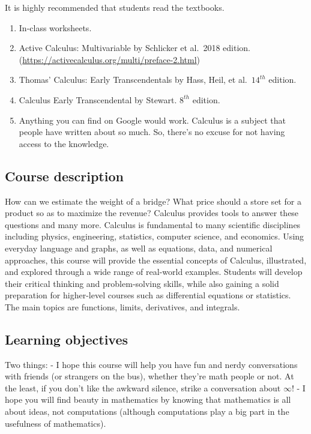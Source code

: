\documentclass[
]{article}
\begin{document}
It is highly recommended that students read the textbooks.

\begin{enumerate}
\def\labelenumi{\arabic{enumi}.}
\item
  In-class worksheets.
\item
  Active Calculus: Multivariable by Schlicker et al.~2018 edition.
  (\url{https://activecalculus.org/multi/preface-2.html})
\item
  Thomas' Calculus: Early Transcendentals by Hass, Heil, et al.~\(14^{th}\) edition.
\item
  Calculus Early Transcendental by Stewart. \(8^{th}\) edition.
\item
  Anything you can find on Google would work.
  Calculus is a subject that people have written about
  so much. So, there's no excuse for not having access
  to the knowledge.
\end{enumerate}

\hypertarget{course-description}{%
\subsection*{Course description}\label{course-description}}

How can we estimate the weight of a bridge? What price should a store set for a product so as to maximize the revenue? Calculus provides tools to answer these questions and many more. Calculus is fundamental to many scientific disciplines including physics, engineering, statistics, computer science, and economics. Using everyday language and graphs, as well as equations, data, and numerical approaches, this course will provide the essential concepts of Calculus, illustrated, and explored through a wide range of real-world examples. Students will develop their critical thinking and problem-solving skills, while also gaining a solid preparation for higher-level courses such as differential equations or statistics. The main topics are functions, limits, derivatives, and integrals.

\hypertarget{learning-objectives}{%
\subsection*{Learning objectives}\label{learning-objectives}}

Two things:
- I hope this course will help you have fun and nerdy conversations with friends (or strangers on the bus), whether they're math people or not.
At the least, if you don't like the awkward silence, strike a conversation about \(\infty\)!
- I hope you will find beauty in mathematics by knowing that mathematics is all about ideas,
not computations (although computations play a big part in the usefulness of mathematics).
\end{document}

